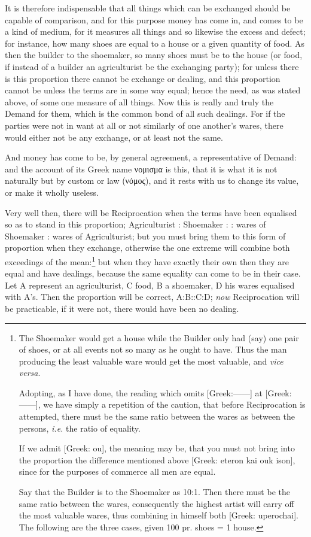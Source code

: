 It is therefore indispensable that all things which can be exchanged should be
capable of comparison, and for this purpose money has come in, and comes to be
a kind of medium, for it measures all things and so likewise the excess and
defect; for instance, how many shoes are equal to a house or a given quantity
of food. As then the builder to the shoemaker, so many shoes must be to the
house (or food, if instead of a builder an agriculturist be the exchanging
party); for unless there is this proportion there cannot be exchange or
dealing, and this proportion cannot be unless the terms are in some way equal;
hence the need, as was stated above, of some one measure of all things. Now
this is really and truly the Demand for them, which is the common bond of all
such dealings. For if the parties were not in want at all or not similarly of
one another’s wares, there would either not be any exchange, or at least
not the same.

And money has come to be, by general agreement, a representative of Demand: and
the account of its Greek name νομισμα is
this, that it is what it is not naturally but by custom or law
(νόμος), and it rests with us to change its value, or
make it wholly useless.

Very well then, there will be Reciprocation when the terms have been equalised
so as to stand in this proportion; Agriculturist : Shoemaker : : wares of
Shoemaker : wares of Agriculturist; but you must bring them to this form of
proportion when they exchange, otherwise the one extreme will combine both
exceedings of the mean:\footnote{The Shoemaker would get a house while the Builder only had (say) one pair of
shoes, or at all events not so many as he ought to have. Thus the man producing
the least valuable ware would get the most valuable, and \emph{vice
versa}.

Adopting, as I have done, the reading which omits [Greek:——] at
[Greek:——], we have simply a repetition of the caution, that before
Reciprocation is attempted, there must be the same ratio between the wares as
between the persons, \emph{i.e.} the ratio of equality.

If we admit [Greek: ou], the meaning may be, that you must not bring into
the proportion the difference mentioned above [Greek: eteron kai ouk ison],
since for the purposes of commerce all men are equal.

Say that the Builder is to the Shoemaker as 10:1. Then there must be the
same ratio between the wares, consequently the highest artist will carry off
the most valuable wares, thus combining in himself both [Greek: uperochai]. The
following are the three cases, given 100 pr. shoes = 1 house.}
but when they have exactly their own then they are equal and have dealings,
because the same equality can come to be in their case. Let A represent an
agriculturist, C food, B a shoemaker, D his wares equalised with A’s.
Then the proportion will be correct, A:B::C:D; \emph{now} Reciprocation will be
practicable, if it were not, there would have been no dealing.

